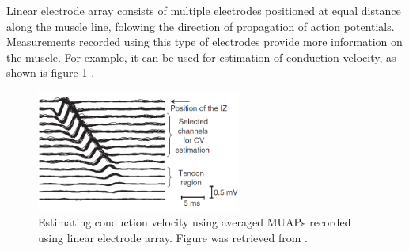 Linear electrode array consists of multiple electrodes positioned at equal distance along the muscle line, folowing the direction of propagation of action potentials. Measurements recorded using this type of electrodes provide more information on the muscle. For example, it can be used for estimation of conduction velocity, as shown is figure \ref{fig:conduction_velocity} \citep{Merletti-book}.
\begin{figure}[ht]
\centering
\includegraphics[width=0.60\textwidth]{Images/introduction/conduction_velocity.png}
\caption{Estimating conduction velocity using averaged MUAPs recorded using linear electrode array. Figure was retrieved from \citep{Merletti-book}.}
\label{fig:conduction_velocity}
\end{figure}

